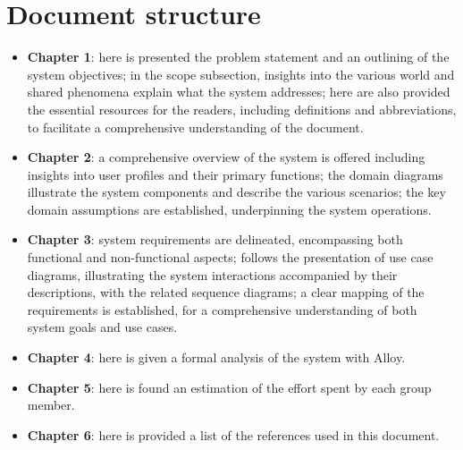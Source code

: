 \section{Document structure}

\begin{itemize}
    \item \textbf{Chapter 1}: here is presented the problem statement and an outlining of the system objectives; in the scope subsection, insights into the various world and shared phenomena explain what the system addresses; here are also provided the essential resources for the readers, including definitions and abbreviations, to facilitate a comprehensive understanding of the document.
    \item \textbf{Chapter 2}: a comprehensive overview of the system is offered including insights into user profiles and their primary functions; the domain diagrams illustrate the system components and describe the various scenarios; the key domain assumptions are established, underpinning the system operations.
    \item \textbf{Chapter 3}: system requirements are delineated, encompassing both functional and non-functional aspects; follows the presentation of use case diagrams, illustrating the system interactions accompanied by their descriptions, with the related sequence diagrams; a clear mapping of the requirements is established, for a comprehensive understanding of both system goals and use cases.
    \item \textbf{Chapter 4}: here is given a formal analysis of the system with Alloy.
    \item \textbf{Chapter 5}: here is found an estimation of the effort spent by each group member.
    \item \textbf{Chapter 6}: here is provided a list of the references used in this document.
\end{itemize}

